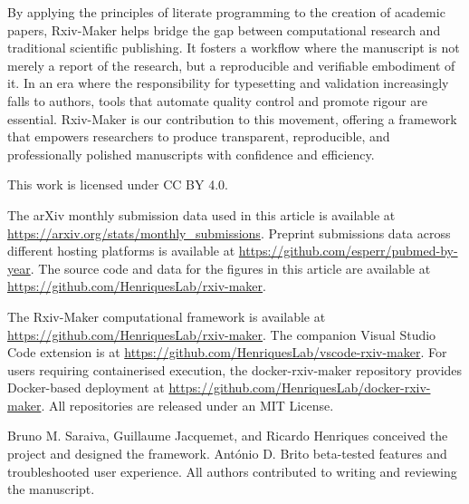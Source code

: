 \documentclass[times, twoside]{rxiv_maker_style}
\begin{document}
By applying the principles of literate programming \cite{Knuth1984_literate_programming} to the creation of academic papers, Rxiv-Maker helps bridge the gap between computational research and traditional scientific publishing. It fosters a workflow where the manuscript is not merely a report of the research, but a reproducible and verifiable embodiment of it. In an era where the responsibility for typesetting and validation increasingly falls to authors, tools that automate quality control and promote rigour are essential. Rxiv-Maker is our contribution to this movement, offering a framework that empowers researchers to produce transparent, reproducible, and professionally polished manuscripts with confidence and efficiency.



\vspace{1em}

\begin{manuscriptinfo}
This work is licensed under CC BY 4.0.
\end{manuscriptinfo}

\begin{data}
The arXiv monthly submission data used in this article is available at \url{https://arxiv.org/stats/monthly_submissions}. Preprint submissions data across different hosting platforms is available at \url{https://github.com/esperr/pubmed-by-year}. The source code and data for the figures in this article are available at \url{https://github.com/HenriquesLab/rxiv-maker}.
\end{data}

\begin{code}
The Rxiv-Maker computational framework is available at \url{https://github.com/HenriquesLab/rxiv-maker}. The companion Visual Studio Code extension is at \url{https://github.com/HenriquesLab/vscode-rxiv-maker}. For users requiring containerised execution, the docker-rxiv-maker repository provides Docker-based deployment at \url{https://github.com/HenriquesLab/docker-rxiv-maker}. All repositories are released under an MIT License.
\end{code}

\begin{contributions}
Bruno M. Saraiva, Guillaume Jacquemet, and Ricardo Henriques conceived the project and designed the framework. António D. Brito beta-tested features and troubleshooted user experience. All authors contributed to writing and reviewing the manuscript.
\end{contributions}
\end{document}
